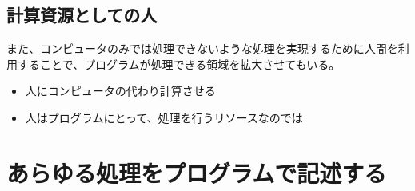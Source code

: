 \subsection{計算資源としての人}\label{ux8a08ux7b97ux8cc7ux6e90ux3068ux3057ux3066ux306eux4eba}

また、コンピュータのみでは処理できないような処理を実現するために人間を利用することで、プログラムが処理できる領域を拡大させてもいる。

\begin{itemize}
\itemsep1pt\parskip0pt
\item
  人にコンピュータの代わり計算させる
\item
  人はプログラムにとって、処理を行うリソースなのでは
\end{itemize}

\section{あらゆる処理をプログラムで記述する}\label{ux3042ux3089ux3086ux308bux51e6ux7406ux3092ux30d7ux30edux30b0ux30e9ux30e0ux3067ux8a18ux8ff0ux3059ux308b}

